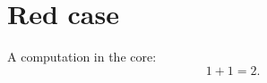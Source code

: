 \chapter{Red case}\label{c99}

A computation in the core:
\begin{equation}\label{c99.eq.eins}
  1 + 1 = 2.
\end{equation}
